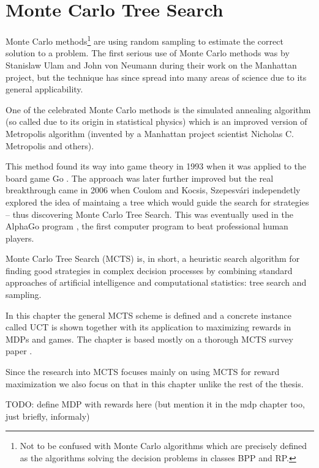 \chapter{Monte Carlo Tree Search}
\label{ch_mcts}

Monte Carlo methods\footnote{Not to be confused with
Monte Carlo algorithms which are precisely defined as the algorithms
solving the decision problems in classes BPP and RP.} are using random sampling to estimate the correct
solution to a problem. The first serious use of Monte Carlo methods was
by Stanislaw Ulam and John von Neumann during their work on the
Manhattan project, but the technique has since spread into many areas of
science due to its general applicability.

One of the celebrated Monte Carlo methods
is the simulated annealing algorithm (so called due to its
origin in statistical physics) which is an improved version of
Metropolis algorithm (invented by a Manhattan project scientist
Nicholas C. Metropolis and others).

This method found its way into game
theory in 1993 when it was applied to the board game Go
\parencite{MonteCarloGo}. The approach was later further improved
\parencite{MonteCarloGoDevel} but the real breakthrough came in 2006
when Coulom \parencite{Coulom} and Kocsis, Szepesvári \parencite{Kocsis}
independetly explored the idea of maintaing a tree which would guide the
search for strategies -- thus discovering Monte Carlo Tree Search.
This was eventually used in the AlphaGo program
\parencite{alphago}, the first
computer program to beat professional human players.

Monte Carlo Tree Search (MCTS) is, in short, a
heuristic search algorithm for finding good strategies in complex
decision processes by combining standard approaches of artificial
intelligence and computational statistics: tree search and sampling.

In this chapter the general MCTS scheme is defined and a concrete instance
called UCT is shown together with its application to maximizing rewards
in MDPs and games. The chapter is based mostly on a thorough MCTS survey
paper \parencite{mcts_survey}.

Since the research into MCTS focuses mainly on using MCTS for reward maximization
we also focus on that in this chapter unlike the rest of the thesis.

TODO: define MDP with rewards here (but mention it in the mdp chapter
too, just briefly, informaly)

